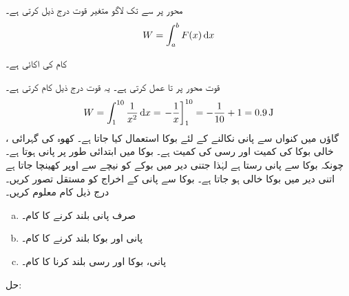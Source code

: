 محور  پر  سے  تک لاگو متغیر قوت  درج ذیل  کرتی ہے۔
\begin{align}
W=\int_a^bF(x)\dif x
\end{align}

کام کی اکائی   ہے۔

قوت  محور  پر  تا  عمل کرتی ہے۔ یہ قوت درج ذیل کام کرتی ہے۔
\begin{align*}
W=\int_1^{10}\frac{1}{x^2}\dif x=\left.-\frac{1}{x}\right]_1^{10}=-\frac{1}{10}+1=\SI{0.9}{\joule}
\end{align*}
گاؤں میں کنواں سے پانی نکالنے کے لئے بوکا استعمال کیا جاتا ہے۔ کھوہ کی گہرائی ، خالی بوکا کی کمیت  اور رسی کی کمیت  ہے۔ بوکا میں ابتدائی طور پر  پانی ہوتا ہے۔چونکہ بوکا سے پانی رستا ہے لہٰذا جتنی دیر میں بوکے کو نیچے سے اوپر کھینچا جاتا ہے اتنی دیر میں بوکا خالی ہو جاتا ہے۔ بوکا سے پانی کے اخراج کو مستقل تصور کریں۔ درج ذیل کام معلوم کریں۔ 
\begin{enumerate}[a.]
\item
صرف پانی بلند کرنے کا کام۔
\item
پانی اور بوکا بلند کرنے کا کام۔
\item
پانی، بوکا اور رسی بلند کرنا کا کام۔
\end{enumerate}
حل:\quad
